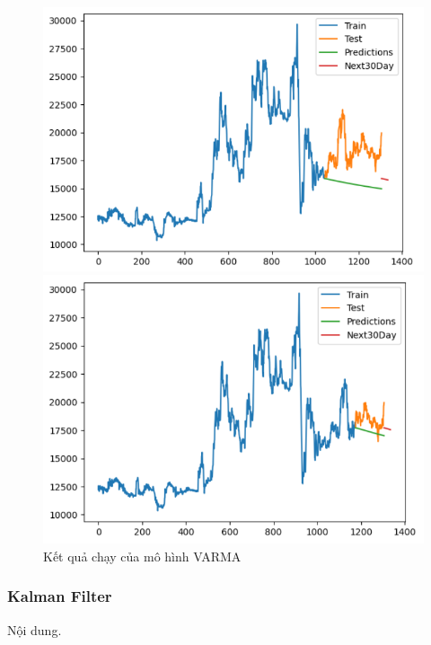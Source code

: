 \begin{figure}[H]
\begin{minipage}{0.15\textwidth}
    \includegraphics[width=1\textwidth]{resources/chapter-5/newdata/result/EIB_VARMA_8-2.png}
    \end{minipage}
    \hfill
        \begin{minipage}{0.15\textwidth}
    \centering
    \includegraphics[width=1\textwidth]{resources/chapter-5/newdata/result/EIB_VARMA_9-1.png}
    \end{minipage}
    \hfill
    
    \caption{Kết quả chạy của mô hình VARMA}
    \label{fig:varma_result}
\end{figure}


\subsubsection{Kalman Filter}
Nội dung.


